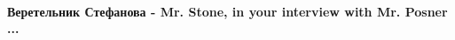 
 
 
 
 
\paragraph{Веретельник Стефанова - Mr. Stone, in your interview with Mr. Posner ... }
\label{sec:31_12_2014.fb.stoun_oliver.kinorezhisser.usa.1.nightingale_in_ukraine.cmt.stefanova.posner}

